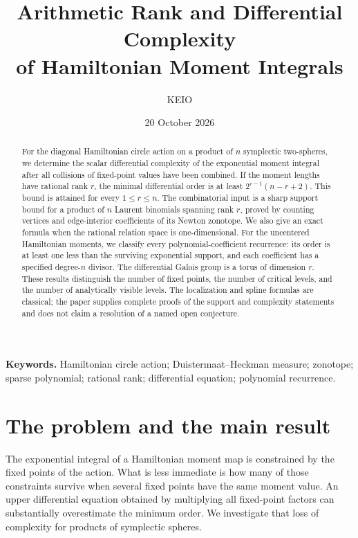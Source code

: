 \documentclass[11pt]{article}
\title{Arithmetic Rank and Differential Complexity\\of Hamiltonian Moment Integrals}
\author{KEIO}
\date{20 October 2026}
\theoremstyle{definition}
\theoremstyle{remark}
\numberwithin{equation}{section}
\begin{document}
\maketitle
\begin{abstract}
For the diagonal Hamiltonian circle action on a product of $n$ symplectic
two-spheres, we determine the scalar differential complexity of the
exponential moment integral after all collisions of fixed-point values
have been combined. If the moment lengths have rational rank $r$, the
minimal differential order is at least $2^{r-1}(n-r+2)$. This bound is
attained for every $1\le r\le n$. The combinatorial input is a sharp
support bound for a product of $n$ Laurent binomials spanning rank $r$,
proved by counting vertices and edge-interior coefficients of its Newton
zonotope. We also give an exact formula when the rational relation space
is one-dimensional. For the uncentered Hamiltonian moments, we classify
every polynomial-coefficient recurrence: its order is at least one less
than the surviving exponential support, and each coefficient has a
specified degree-$n$ divisor. The differential Galois group is a torus
of dimension $r$. These results distinguish the number of fixed points,
the number of critical levels, and the number of analytically visible
levels. The localization and spline formulas are classical; the paper
supplies complete proofs of the support and complexity statements and
does not claim a resolution of a named open conjecture.
\end{abstract}
\noindent\textbf{Keywords.} Hamiltonian circle action; Duistermaat--Heckman
measure; zonotope; sparse polynomial; rational rank; differential equation;
polynomial recurrence.

\section{The problem and the main result}
The exponential integral of a Hamiltonian moment map is constrained by
the fixed points of the action. What is less immediate is how many of
those constraints survive when several fixed points have the same moment
value. An upper differential equation obtained by multiplying all
fixed-point factors can substantially overestimate the minimum order.
We investigate that loss of complexity for products of symplectic spheres.
\end{document}
